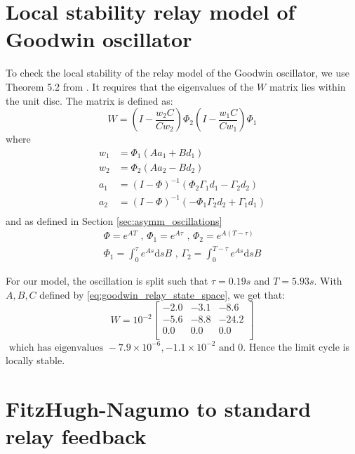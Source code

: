 \documentclass[a4paper, 12pt]{article}
\begin{document}
\newpage
\begin{appendices}
\appendixpage
{}
\renewcommand{\thefigure}{A\arabic{figure}}
\setcounter{figure}{0}
\label{Appendix}
\section{Local stability relay model of Goodwin oscillator}
To check the local stability of the relay model of the Goodwin oscillator, we use Theorem 5.2 from \cite{astrom1995}. It requires that the eigenvalues of the $W$ matrix lies within the unit disc. The matrix is defined as:
\begin{equation}
W = \left(I - \frac{w_2C}{Cw_2}\right)\Phi_2\left(I - \frac{w_1C}{Cw_1}\right)\Phi_1
\end{equation}
where
\begin{align}
w_1 &= \Phi_1(Aa_1+Bd_1) \\
w_2 &= \Phi_2(Aa_2-Bd_2) \\
a_1 &= (I-\Phi)^{-1}(\Phi_2\Gamma_1d_1-\Gamma_2d_2)\\
a_2 &= (I-\Phi)^{-1}(-\Phi_1\Gamma_2d_2+\Gamma_1d_1)\\
\end{align}
and as defined in Section \ref{sec:asymm_oscillations}
\begin{equation}
\begin{array}{l}
\displaystyle \Phi = e^{AT}  \text{  ,  }\Phi_1 = e^{A\tau} \text{  ,  }  \Phi_2 = e^{A(T-\tau)} \\
\displaystyle \Phi_1 = \int_0^\tau e^{As}\text{d}sB \text{  ,  } \Gamma_2 = \int_0^{T-\tau}e^{As}\text{d}sB
\end{array}
\end{equation}

For our model, the oscillation is split such that $\tau = 0.19s $ and $T = 5.93s$. With $A,B,C$ defined by \ref{eq:goodwin_relay_state_space}, we get that:
\begin{equation}
W = 10^{-2}\begin{bmatrix}
-2.0 & -3.1 & -8.6 \\ -5.6 & -8.8& -24.2 \\ 0.0 & 0.0 & 0.0 \\
\end{bmatrix}
\end{equation}
$\text{  which has eigenvalues } -7.9\times10^{-6}, -1.1\times10^{-2} \text{ and } 0. $
Hence the limit cycle is locally stable. 
\newpage
\section{FitzHugh-Nagumo to standard relay feedback}\vspace{-.8cm}


\end{appendices}
\end{document}

